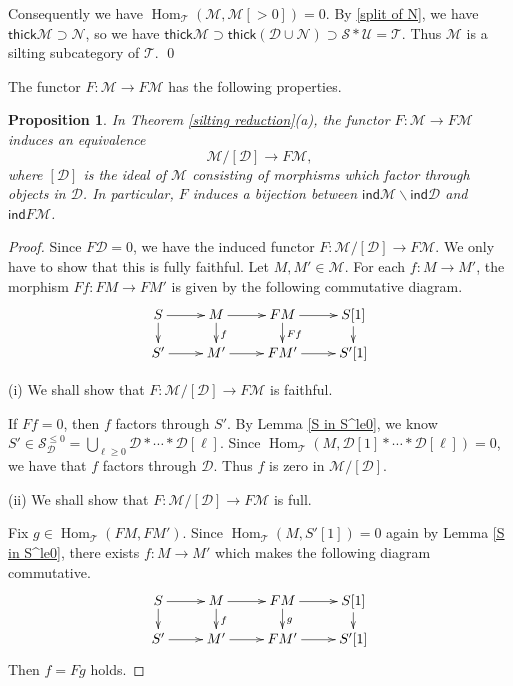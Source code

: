 \documentclass[a4paper,reqno]{amsart}
\newtheorem{proposition}[theorem]{Proposition}
\theoremstyle{definition}
\newcommand{\DD}{{\mathcal D}}
\newcommand{\SSS}{{\mathcal S}}
\newcommand{\UU}{{\mathcal U}}
\newcommand{\TT}{{\mathcal T}}
\newcommand{\MM}{{\mathcal M}}
\newcommand{\NN}{{\mathcal N}}
\newcommand{\ind}{\mathsf{ind}}
\newcommand{\thick}{\mathsf{thick}}
\newcommand{\Hom}{\operatorname{Hom}\nolimits}
\begin{document}
Consequently we have $\Hom_{\TT}(\MM,\MM[>0])=0$.
By \eqref{split of N}, we have $\thick\MM\supset\NN$, so we have $\thick\MM\supset\thick(\DD\cup\NN)\supset\SSS*\UU=\TT$.
Thus $\MM$ is a silting subcategory of $\TT$.
%
%
\qed

\medskip
The functor $F:\MM\to F\MM$ has the following properties.

\begin{proposition}\label{M and FM}
In Theorem \ref{silting reduction}(a), the functor $F:\MM\to F\MM$ induces an equivalence
\[\MM/[\DD]\to F\MM,\]
where $[\DD]$ is the ideal of $\MM$ consisting of morphisms which factor through objects in $\DD$.
In particular, $F$ induces a bijection between $\ind\MM\backslash\ind\DD$ and $\ind F\MM$.
\end{proposition}

\begin{proof}
Since $F\DD=0$, we have the induced functor $F:\MM/[\DD]\to F\MM$.
We only have to show that this is fully faithful.
Let $M,M'\in\MM$. For each $f:M\to M'$, the morphism $Ff:FM\to FM'$ is given by the following commutative diagram.
\[\xymatrix@R=.4cm{
S\ar[r]\ar[d]&M\ar[r]\ar[d]^f&FM\ar[r]\ar[d]^{Ff}&S[1]\ar[d]\\
S'\ar[r]&M'\ar[r]&FM'\ar[r]&S'[1]
}\]

(i) We shall show that $F:\MM/[\DD]\to F\MM$ is faithful.

If $Ff=0$, then $f$ factors through $S'$. By Lemma \ref{S in S^le0}, we know
$S'\in\SSS^{\leq0}_{\DD}=\bigcup_{\ell\ge0}\DD*\cdots*\DD[\ell]$.
Since $\Hom_{\TT}(M,\DD[1]*\cdots*\DD[\ell])=0$, we have that $f$ factors through $\DD$.
Thus $f$ is zero in $\MM/[\DD]$.

(ii) We shall show that $F:\MM/[\DD]\to F\MM$ is full.

Fix $g\in\Hom_{\TT}(FM,FM')$. Since $\Hom_{\TT}(M,S'[1])=0$ again by Lemma \ref{S in S^le0}, there exists $f:M\to M'$ which makes the following diagram commutative.
\[\xymatrix@R=.4cm{
S\ar[r]\ar[d]&M\ar[r]\ar[d]^f&FM\ar[r]\ar[d]^{g}&S[1]\ar[d]\\
S'\ar[r]&M'\ar[r]&FM'\ar[r]&S'[1]
}\]
Then $f=Fg$ holds.
\end{proof}
\end{document}
